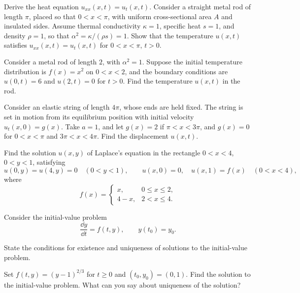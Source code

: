 \documentclass[11pt,oneside]{article}
\begin{document}
\begin{problem}
Derive the heat equation $u_{xx}(x,t)=u_t(x,t)$. Consider a straight metal rod of length $\pi$, placed so that $0<x<\pi$, with uniform cross-sectional area $A$ and insulated sides. Assume thermal conductivity $\kappa=1$, specific heat $s=1$, and density $\rho=1$, so that $\alpha^2=\kappa/(\rho s)=1$. Show that the temperature $u(x,t)$ satisfies $u_{xx}(x,t)=u_t(x,t)$ for $0<x<\pi$, $t>0$.
\end{problem}

\begin{problem}
Consider a metal rod of length $2$, with $\alpha^2=1$. Suppose the initial temperature distribution is $f(x)=x^2$ on $0<x<2$, and the boundary conditions are $u(0,t)=6$ and $u(2,t)=0$ for $t>0$. Find the temperature $u(x,t)$ in the rod.
\end{problem}

\begin{problem}
Consider an elastic string of length $4\pi$, whose ends are held fixed. The string is set in motion from its equilibrium position with initial velocity $u_t(x,0)=g(x)$. Take $a=1$, and let $g(x)=2$ if $\pi<x<3\pi$, and $g(x)=0$ for $0<x<\pi$ and $3\pi<x<4\pi$. Find the displacement $u(x,t)$.
\end{problem}

\begin{problem}
Find the solution $u(x,y)$ of Laplace's equation in the rectangle $0<x<4$, $0<y<1$, satisfying
\[
u(0,y)=u(4,y)=0\quad(0<y<1),\qquad
u(x,0)=0,\quad u(x,1)=f(x)\quad(0<x<4),
\]
where
\[
f(x)=\begin{cases}x,&0\le x\le2,\\4-x,&2<x\le4.\end{cases}
\]
\end{problem}

\begin{problem}
Consider the initial-value problem
\[\frac{\dd y}{\dd t}=f(t,y),\qquad y(t_0)=y_0.\]
\begin{problemsubparts}
\item State the conditions for existence and uniqueness of solutions to the initial-value problem.
\item Set $f(t,y)=(y-1)^{2/3}$ for $t\ge0$ and $(t_0,y_0)=(0,1)$. Find the solution to the initial-value problem. What can you say about uniqueness of the solution?
\end{problemsubparts}
\end{problem}
\end{document}
